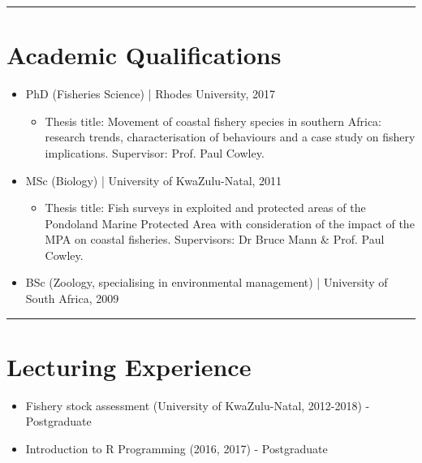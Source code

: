 \documentclass[10pt,a4paper]{article}
\begin{document}
\hrule	
\vspace{6pt}
\noindent



\noindent
\section*{Academic Qualifications}
\begin{itemize}[itemsep=2pt, parsep=0pt]
   \setlength\itemsep{0.05em}
   \item PhD (Fisheries Science) | Rhodes University, 2017
      \begin{itemize}[itemsep=2pt, parsep=0pt]
	\setlength\itemsep{0.05em}
	\item Thesis title: Movement of coastal fishery species in southern Africa: research trends, characterisation of behaviours and a case study on fishery implications. Supervisor: Prof. Paul Cowley.
      \end{itemize}
		\item MSc (Biology) | University of KwaZulu-Natal, 2011
		\begin{itemize}[itemsep=2pt, parsep=0pt]
		\setlength\itemsep{0.05em}
			\item Thesis title: Fish surveys in exploited and protected areas of the Pondoland Marine Protected Area with consideration of the impact of the MPA on coastal fisheries. Supervisors: Dr Bruce Mann \& Prof. Paul Cowley.
		\end{itemize}
		\item BSc (Zoology, specialising in environmental management) | University of South Africa, 2009 
	\end{itemize}

\hrule
\vspace{6pt}

\noindent
\section*{Lecturing Experience}
	\begin{itemize}[itemsep=2pt, parsep=0pt]
		\setlength\itemsep{0.05em}
		\item Fishery stock assessment (University of KwaZulu-Natal, 2012-2018) - Postgraduate
		\item Introduction to R Programming (2016, 2017) - Postgraduate
	\end{itemize}
\end{document}
